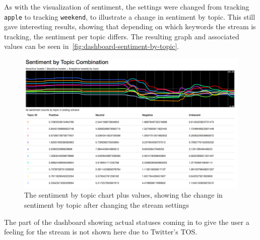 As with the visualization of sentiment,
the settings were changed from tracking \texttt{apple} to tracking \texttt{weekend}, to illustrate a change in sentiment by topic.
This still gave interesting results, showing that depending on which keywords the stream is tracking,
the sentiment per topic differs.
The resulting graph and associated values can be seen in~\autoref{fig:dashboard-sentiment-by-topic}.

\begin{figure}
    \centering
    \caption{The sentiment by topic chart plus values, showing the change in sentiment by topic after changing the stream settings}
    \label{fig:dashboard-sentiment-by-topic}
    \includegraphics[width=\textwidth]{../images/dashboard_sentiment_by_topic.png}
\end{figure}

The part of the dashboard showing actual statuses coming in to give the user a feeling for the stream is not shown here due to Twitter's TOS.